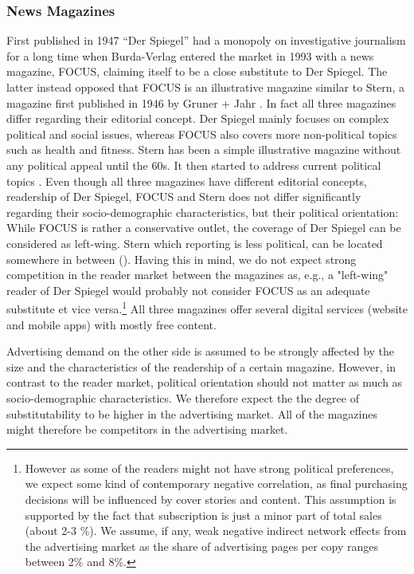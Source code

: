 \documentclass[12pt,a4paper,notitlepage]{article}
\begin{document}
\subsubsection{News Magazines} 
First published in 1947 ``Der Spiegel'' had a monopoly on investigative journalism for a long time when Burda-Verlag entered the market in 1993 with a news magazine, FOCUS, claiming itself to be a close substitute to Der Spiegel. The latter instead opposed that FOCUS is an illustrative magazine similar to Stern, a magazine first published in 1946 by Gruner + Jahr \citep{kaltenhaeuser_abstimmung_2005}. In fact all three magazines differ regarding their editorial concept. Der Spiegel mainly focuses on complex political and social issues, whereas FOCUS also covers more non-political topics such as health and fitness. Stern has been a simple illustrative magazine without any political appeal until the 60s. It then started to address current political topics \citep{vogel_populaere_1998}. Even though all three magazines have different editorial concepts, readership of Der Spiegel, FOCUS and Stern does not differ significantly regarding their socio-demographic characteristics, but their political orientation: While FOCUS is rather a conservative outlet, the coverage of Der Spiegel can be considered as left-wing. Stern which reporting is less political, can be located somewhere in between (\citet{kaltenhaeuser_abstimmung_2005}). Having this in mind, we do not expect strong competition in the reader market between the magazines as, e.g., a "left-wing" reader of Der Spiegel would probably not consider FOCUS as an adequate substitute et vice versa.\footnote{However as some of the readers might not have strong political preferences, we expect some kind of contemporary negative correlation, as final purchasing decisions will be influenced by cover stories and content. This assumption is supported by the fact that subscription is just a minor part of total sales (about 2-3 $\%$). We assume, if any, weak negative indirect network effects from the advertising market as the share of advertising pages per copy ranges between 2$\%$ and 8$\%$.} All three magazines offer several digital services (website and mobile apps) with mostly free content. 

Advertising demand on the other side is assumed to be strongly affected by the size and the characteristics of the readership of a certain magazine. However, in contrast to the reader market, political orientation should not matter as much as socio-demographic characteristics. We therefore expect the the degree of substitutability to be higher in the advertising market. All of the magazines might therefore be competitors in the advertising market.  
\end{document}
